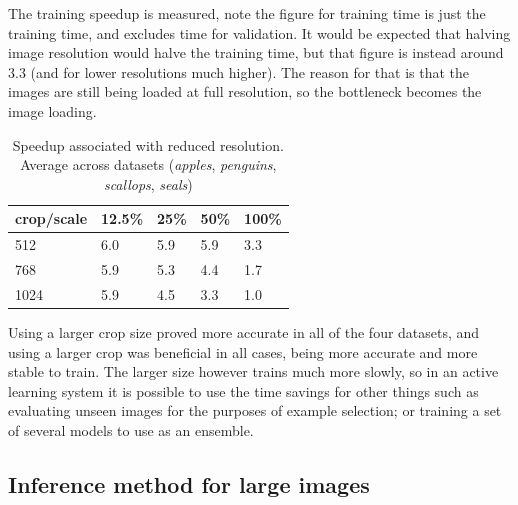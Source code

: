 The training speedup is measured, note the figure for training time is just the training time, and excludes time for validation. It would be expected that halving image resolution would halve the training time, but that figure is instead around $3.3$ (and for lower resolutions much higher). The reason for that is that the images are still being loaded at full resolution, so the bottleneck becomes the image loading.

\begin{table}[ht]
  \centering
    \caption{Speedup associated with reduced resolution. Average across datasets (\emph{apples}, \emph{penguins}, \emph{scallops}, \emph{seals})  }
  \begin{tabular}{ l | l l l l}
    crop/scale & 12.5\% & 25\% & 50\% & 100\% \\
    \toprule
        512   & 6.0  & 5.9  &  5.9  & 3.3 \\
        768   & 5.9 & 5.3  &  4.4 &  1.7 \\
        1024  & 5.9 & 4.5  &  3.3  & 1.0 \\
    \bottomrule
  \end{tabular}
\label{fig:accuracy_scale_crop}
\end{table}


Using a larger crop size proved more accurate in all of the four datasets, and using a larger crop was beneficial in all cases, being more accurate and more stable to train. The larger size however trains much more slowly, so in an active learning system it is possible to use the time savings for other things such as evaluating unseen images for the purposes of example selection; or training a set of several models to use as an ensemble.


\subsection {Inference method for large images}

